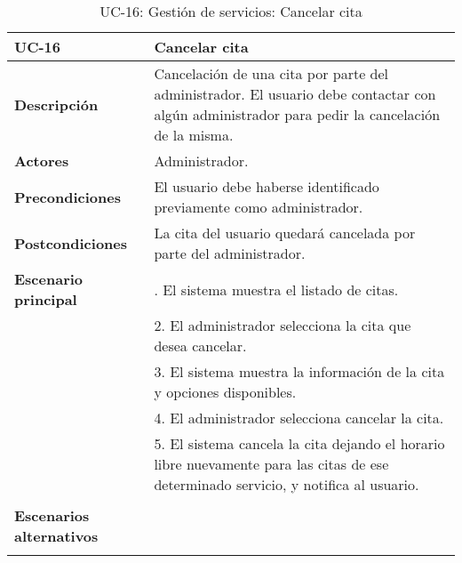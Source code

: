\begin{table}[H]
  \begin{center}
    \begin{tabularx}{16.4cm}{|l|X|}
      \hline
      \textbf{UC-16} & \textbf{Cancelar cita}\\
      \hline
      \textbf{Descripción} & Cancelación de una cita por parte del administrador. El usuario debe contactar con algún administrador para pedir la cancelación de la misma.\\
      \hline
      \textbf{Actores} & Administrador.\\
      \hline
      \textbf{Precondiciones} & El usuario debe haberse identificado previamente como administrador.\\
      \hline
      \textbf{Postcondiciones} & La cita del usuario quedará cancelada por parte del administrador.\\
      \hline
      \textbf{Escenario principal} & \smallskip 1. El sistema muestra el listado de citas.\\
      & 2. El administrador selecciona la cita que desea cancelar.\\
      & 3. El sistema muestra la información de la cita y opciones disponibles.\\
      & 4. El administrador selecciona cancelar la cita.\\
      & 5. El sistema cancela la cita dejando el horario libre nuevamente para las citas de ese determinado servicio, y notifica al usuario.\\
      & \\
      \hline
      \textbf{Escenarios alternativos} & \\
      & \\
      \hline
    \end{tabularx}
    \caption{UC-16: Gestión de servicios: Cancelar cita}
  \end{center}
\end{table}


